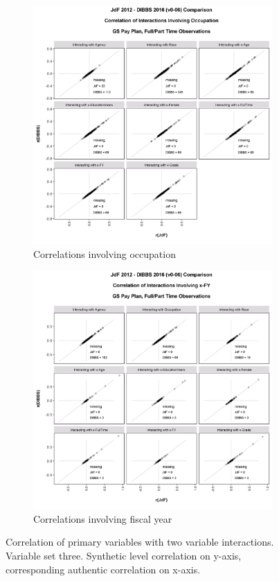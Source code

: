 \documentclass[10pt, letterpaper]{article}
\begin{document}
\begin{spacing}{1.0}
\clearpage

\begin{figure}[h]
    \centering
    \begin{subfigure}{1\textwidth}
        \centering
        \includegraphics[width=4.5in, trim={0 0.2in 0 1in}, clip]{JdFDIBBSCorrelationInteraction-Occupation.png}
        \caption{Correlations involving occupation}
        \vspace{12pt}
    \end{subfigure}
    \begin{subfigure}{1\textwidth}
        \centering
        \includegraphics[width=4.5in, trim={0 0.2in 0 1in}, clip]{JdFDIBBSCorrelationInteraction-x-FY.png}
        \caption{Correlations involving fiscal year}
        \vspace{12pt}
    \end{subfigure}
    \caption{Correlation of primary variables with two variable interactions.  Variable set three.  Synthetic level correlation on y-axis, corresponding authentic correlation on x-axis.}
    \label{figure:JdFDIBBSCorrelationInteraction3}
\end{figure}


\end{spacing}
\end{document}
